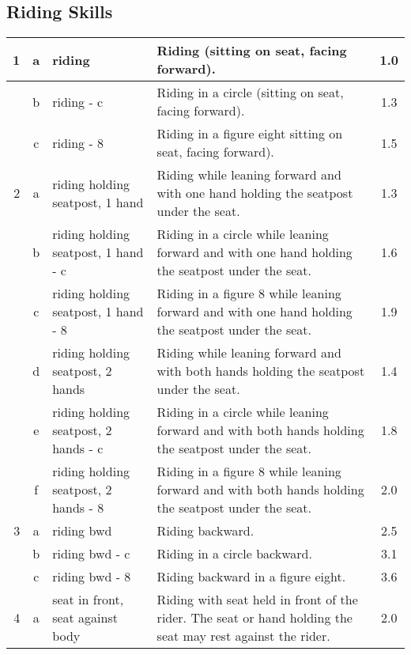 \subsection{Riding Skills}
\renewcommand{\arraystretch}{1.5}
\begin{longtable}{|r|c|p{4cm}|p{8cm}|c|}
\hline
1 & a & riding  & Riding (sitting on seat, facing forward). & 1.0 \\ 
\hline
  & b & riding - c  & Riding in a circle (sitting on seat, facing forward). & 1.3 \\ 
\hline
  & c & riding - 8  & Riding in a figure eight sitting on seat, facing forward).  & 1.5 \\ 
\hline
2 & a & riding holding seatpost, 1 hand & Riding while leaning forward and with one hand holding the seatpost under the seat. & 1.3 \\ 
\hline
  & b & riding holding seatpost, 1 hand - c & Riding in a circle while leaning forward and with one hand holding the seatpost under the seat. & 1.6 \\ 
\hline
  & c & riding holding seatpost, 1 hand - 8 & Riding in a figure 8 while leaning forward and with one hand holding the seatpost under the seat. & 1.9 \\ 
\hline
  & d & riding holding seatpost, 2 hands  & Riding while leaning forward and with both hands holding the seatpost under the seat. & 1.4 \\ 
\hline
  & e & riding holding seatpost, 2 hands - c  & Riding in a circle while leaning forward and with both hands holding the seatpost under the seat. & 1.8 \\ 
\hline
  & f & riding holding seatpost, 2 hands - 8  & Riding in a figure 8 while leaning forward and with both hands holding the seatpost under the seat. & 2.0 \\ 
\hline
3 & a & riding bwd  & Riding backward.  & 2.5 \\ 
\hline
  & b & riding bwd - c  & Riding in a circle backward.  & 3.1 \\ 
\hline
  & c & riding bwd - 8  & Riding backward in a figure eight.  & 3.6 \\ 
\hline
4 & a & seat in front, seat against body  & Riding with seat held in front of the rider. The seat or hand holding the seat may rest against the rider.  & 2.0 \\ 

\end{longtable}
